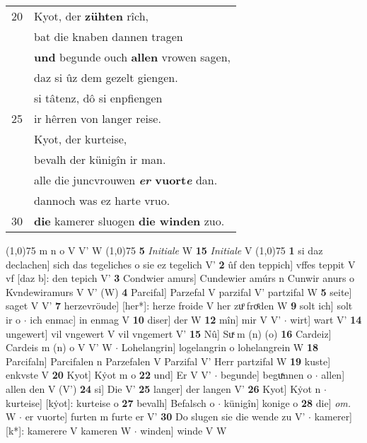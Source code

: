 \documentclass[8pt,a4paper,notitlepage]{article}
\begin{document}
\begin{table}[ht]
\begin{minipage}[t]{0.5\linewidth}
\begin{tabular}{rl}
20 & Kyot, der \textbf{zühten} rîch,\\ 
 & bat die knaben dannen tragen\\ 
 & \textbf{und} begunde ouch \textbf{allen} vrowen sagen,\\ 
 & daz si ûz dem gezelt giengen.\\ 
 & si tâtenz, dô si enpfiengen\\ 
25 & ir hêrren von langer reise.\\ 
 & Kyot, der kurteise,\\ 
 & bevalh der künigîn ir man.\\ 
 & alle die juncvrouwen \textbf{\textit{er} vuort\textit{e}} dan.\\ 
 & dannoch was ez harte vruo.\\ 
30 & \textbf{die} kamerer sluogen \textbf{die winden} zuo.\\ 
\end{tabular}
\scriptsize
\line(1,0){75} \newline
m n o V V' W \newline
\line(1,0){75} \newline
\textbf{5} \textit{Initiale} W  \textbf{15} \textit{Initiale} V  \newline
\line(1,0){75} \newline
\textbf{1} si daz declachen] sich das tegeliches o sie ez tegelich V' \textbf{2} ûf den teppich] vffes teppit V vf [daz b]: den tepich V' \textbf{3} Condwier amurs] Cundewier amúrs n Cunwir anurs o Kvndewiramurs V V' (W) \textbf{4} Parcifal] Parzefal V parzifal V' partzifal W \textbf{5} seite] saget V V' \textbf{7} herzevröude] [her*]: herze froide V her zuͦ froͤden W \textbf{9} solt ich] solt ir o  $\cdot$ ich enmac] in enmag V \textbf{10} diser] der W \textbf{12} mîn] mir V V'  $\cdot$ wirt] wart V' \textbf{14} ungewert] vil vngewert V vil vngemert V' \textbf{15} Nû] Suͯ m (n) (o) \textbf{16} Cardeiz] Cardeis m (n) o V V' W  $\cdot$ Lohelangrin] logelangrin o lohelangrein W \textbf{18} Parcifaln] Parcifalen n Parzefalen V Parzifal V' Herr partzifal W \textbf{19} kuste] enkvste V \textbf{20} Kyot] Kẏot m o \textbf{22} und] Er V V'  $\cdot$ begunde] beguͯnnen o  $\cdot$ allen] allen den V (V') \textbf{24} si] Die V' \textbf{25} langer] der langen V' \textbf{26} Kyot] Kẏot n  $\cdot$ kurteise] [kẏot]: kurteise o \textbf{27} bevalh] Befalsch o  $\cdot$ künigîn] konige o \textbf{28} die] \textit{om.} W  $\cdot$ er vuorte] furten m furte er V' \textbf{30} Do slugen sie die wende zu V'  $\cdot$ kamerer] [k*]: kamerere V kameren W  $\cdot$ winden] winde V W \newline
\end{minipage}
\end{table}
\end{document}
